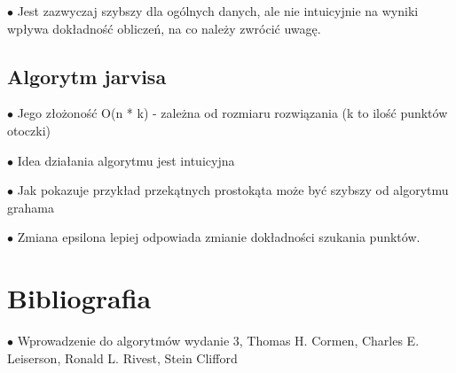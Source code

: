 \documentclass[12pt]{article}
\begin{document}
$\bullet$ Jest zazwyczaj szybszy dla ogólnych danych, ale nie intuicyjnie na wyniki wpływa dokładność obliczeń, na co należy zwrócić uwagę.

\subsection*{Algorytm jarvisa}
$\bullet$ Jego złożoność O(n * k) - zależna od rozmiaru rozwiązania (k to ilość punktów otoczki)


$\bullet$ Idea działania algorytmu jest intuicyjna


$\bullet$ Jak pokazuje przykład przekątnych prostokąta może być szybszy od algorytmu grahama


$\bullet$ Zmiana epsilona lepiej odpowiada zmianie dokładności szukania punktów.


\section*{Bibliografia}
\par
$\bullet$ Wprowadzenie do algorytmów wydanie 3, Thomas H. Cormen, Charles E. Leiserson, Ronald L. Rivest, Stein Clifford
\end{document}
